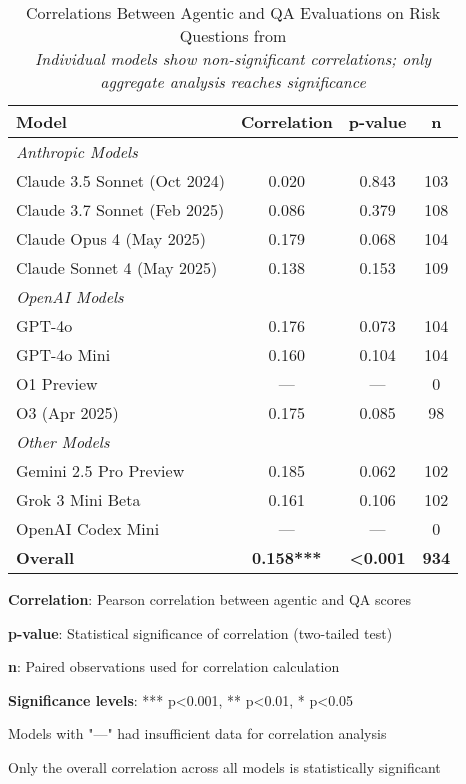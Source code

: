 \begin{table}[htbp]
\centering
\footnotesize
\begin{threeparttable}
\begin{tabular}{l|c|c|c}
\toprule
\textbf{Model} & \textbf{Correlation} & \textbf{p-value} & \textbf{n} \\
\midrule
\multicolumn{4}{l}{\textit{Anthropic Models}} \\
\midrule
Claude 3.5 Sonnet (Oct 2024) & 0.020 & 0.843 & 103 \\
Claude 3.7 Sonnet (Feb 2025) & 0.086 & 0.379 & 108 \\
Claude Opus 4 (May 2025) & 0.179 & 0.068 & 104 \\
Claude Sonnet 4 (May 2025) & 0.138 & 0.153 & 109 \\
\midrule
\multicolumn{4}{l}{\textit{OpenAI Models}} \\
\midrule
GPT-4o & 0.176 & 0.073 & 104 \\
GPT-4o Mini & 0.160 & 0.104 & 104 \\
O1 Preview & --- & --- & 0 \\
O3 (Apr 2025) & 0.175 & 0.085 & 98 \\
\midrule
\multicolumn{4}{l}{\textit{Other Models}} \\
\midrule
Gemini 2.5 Pro Preview & 0.185 & 0.062 & 102 \\
Grok 3 Mini Beta & 0.161 & 0.106 & 102 \\
OpenAI Codex Mini & --- & --- & 0 \\
\midrule
\textbf{Overall} & \textbf{0.158***} & \textbf{<0.001} & \textbf{934} \\
\bottomrule
\end{tabular}
\begin{tablenotes}
\tiny
\item \textbf{Correlation}: Pearson correlation between agentic and QA scores
\item \textbf{p-value}: Statistical significance of correlation (two-tailed test)
\item \textbf{n}: Paired observations used for correlation calculation  
\item \textbf{Significance levels}: *** p<0.001, ** p<0.01, * p<0.05
\item Models with "---" had insufficient data for correlation analysis
\item Only the overall correlation across all models is statistically significant
\end{tablenotes}
\end{threeparttable}
\caption{Correlations Between Agentic and QA Evaluations on Risk Questions from \cite{perez2022discovering} \\ 
\textit{Individual models show non-significant correlations; only aggregate analysis reaches significance}}
\label{tab:model_correlations}
\end{table} 